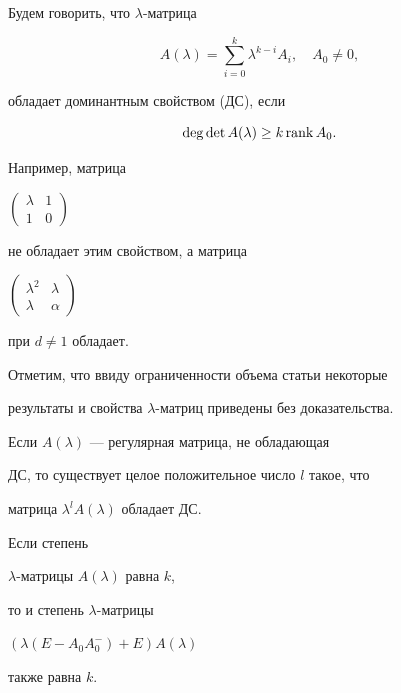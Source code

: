  


\begin{defn} Будем говорить, что $\lambda$-матрица 


$$ 


A(\lambda)=\sum^k_{i=0}\lambda^{k-i}A_i,\quad A_0\ne 0, 


$$ 


обладает доминантным свойством (ДС), если 


$$ 


\deg\det A(\lambda)\ge k\rank A_0. 


$$ 


\end{defn} 


 


Например, матрица 


$\left(\begin{smallmatrix} \lambda & 1 \\ 1 & 0 


\end{smallmatrix}\right)$ 


не обладает этим свойством, а матрица 


$\left(\begin{smallmatrix} \lambda^2 & \lambda \\ \lambda & \alpha 


\end{smallmatrix}\right)$ 


при $d\ne 1$ обладает. 


 


Отметим, что ввиду ограниченности объема статьи некоторые 


результаты и свойства $\lambda$-матриц приведены без доказательства. 


 


\begin{pty} Если $A(\lambda)$ --- регулярная матрица, не обладающая 


ДС, то существует целое положительное число $l$ такое, что 


матрица $\lambda^l A(\lambda)$ обладает ДС. 


\end{pty} 


 


\begin{pty} Если степень 


$\lambda$-матрицы $A(\lambda)$ равна $k$, 


то и степень $\lambda$-матрицы 


$(\lambda(E-A_0A^-_0)+E)A(\lambda)$ 


также равна $k$. 


\end{pty} 


